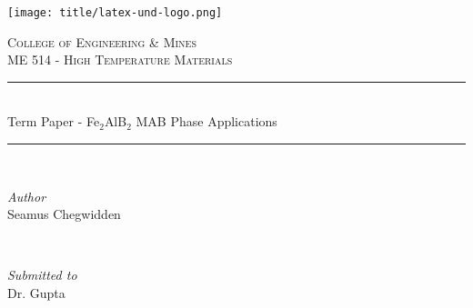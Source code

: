 \begin{titlepage}

\newcommand{\HRule}{\rule{\linewidth}{0.5mm}} %

\centering
\texttt{[image: title/latex-und-logo.png]}\\[1cm] %
 

\center %


\textsc{\Large College of Engineering \& Mines}\\[0.5cm] 
\textsc{\large ME 514 - High Temperature Materials}\\[0.5cm] 

\makeatletter
\HRule \\[0.4cm]
{ \huge Term Paper - Fe$_2$AlB$_2$ MAB Phase Applications}\\[0.4cm] %
\HRule \\[1.5cm]
 

\begin{minipage}[t]{0.4\textwidth}
\begin{flushleft} \large
\emph{Author}\\
Seamus Chegwidden

\end{flushleft}
\end{minipage}
~
\begin{minipage}[t]{0.4\textwidth}
\begin{flushright} \large
\emph{Submitted to} \\
Dr. Gupta \\[1.2em] 
\end{flushright}
\end{minipage}\\[2cm]
\makeatother


\end{titlepage}
